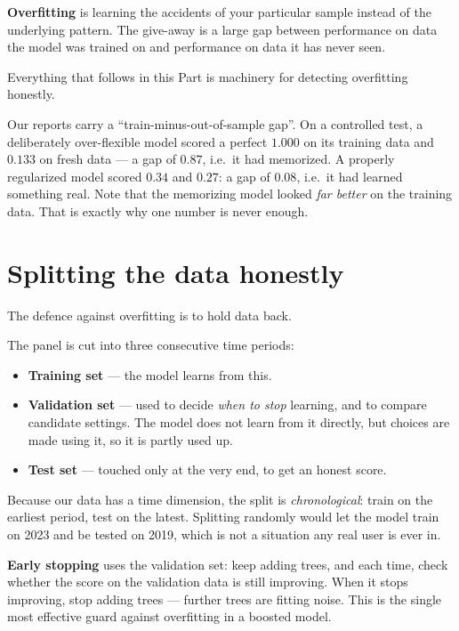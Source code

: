 \documentclass[11pt]{article}
\begin{document}
\begin{specbox}
\textbf{Overfitting} is learning the accidents of your particular sample instead of
the underlying pattern. The give-away is a large gap between performance on data the
model was trained on and performance on data it has never seen.
\end{specbox}

Everything that follows in this Part is machinery for detecting overfitting honestly.

\begin{keybox}
Our reports carry a ``train-minus-out-of-sample gap''. On a controlled test, a
deliberately over-flexible model scored a perfect $1.000$ on its training data and
$0.133$ on fresh data --- a gap of $0.87$, i.e.\ it had memorized. A properly
regularized model scored $0.34$ and $0.27$: a gap of $0.08$, i.e.\ it had learned
something real. Note that the memorizing model looked \emph{far better} on the
training data. That is exactly why one number is never enough.
\end{keybox}

\section{Splitting the data honestly}

The defence against overfitting is to hold data back.

\begin{specbox}
The panel is cut into three consecutive time periods:
\begin{itemize}
  \item \textbf{Training set} --- the model learns from this.
  \item \textbf{Validation set} --- used to decide \emph{when to stop} learning, and to
        compare candidate settings. The model does not learn from it directly, but
        choices are made using it, so it is partly used up.
  \item \textbf{Test set} --- touched only at the very end, to get an honest score.
\end{itemize}
Because our data has a time dimension, the split is \emph{chronological}: train on the
earliest period, test on the latest. Splitting randomly would let the model train on
2023 and be tested on 2019, which is not a situation any real user is ever in.
\end{specbox}

\textbf{Early stopping} uses the validation set: keep adding trees, and each time,
check whether the score on the validation data is still improving. When it stops
improving, stop adding trees --- further trees are fitting noise. This is the single
most effective guard against overfitting in a boosted model.
\end{document}
